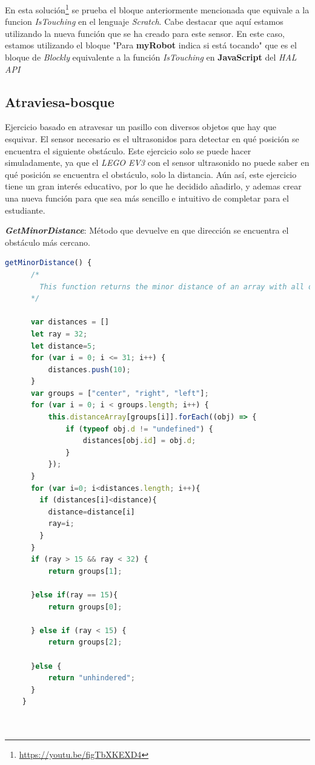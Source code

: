     En esta solución\footnote{\url{https://youtu.be/figTbXKEXD4}} se prueba el bloque anteriormente mencionada que equivale a la funcion \textit{IsTouching} en el lenguaje \textit{Scratch}. Cabe destacar que aquí estamos  utilizando la nueva función que se ha creado para este sensor. En este caso, estamos utilizando el bloque "Para \textbf{myRobot} indica si está tocando" que es el bloque de \textit{Blockly} equivalente a la función \textit{IsTouching} en \textbf{JavaScript} del \textit{HAL API}
    
\subsection{Atraviesa-bosque}
\label{subsec:atraviesabosque}
Ejercicio basado en atravesar un pasillo con diversos objetos que hay que esquivar. El sensor necesario es el ultrasonidos para detectar en qué posición se encuentra el siguiente obstáculo. Este ejercicio solo se puede hacer simuladamente, ya que el \textit{LEGO EV3} con el sensor ultrasonido no puede saber en qué posición se encuentra el obstáculo, solo la distancia. Aún así, este ejercicio tiene un gran interés educativo, por lo que he decidido añadirlo, y ademas crear una nueva función para que sea más sencillo e intuitivo de completar para el estudiante.

\textit{\textbf{GetMinorDistance}}: Método que devuelve en que dirección se encuentra el obstáculo más cercano. 

 \begin{lstlisting}[language=javascript]
 getMinorDistance() {
      /*
        This function returns the minor distance of an array with all distances
      */

      var distances = []
      let ray = 32;
      let distance=5;
      for (var i = 0; i <= 31; i++) {
          distances.push(10);
      }
      var groups = ["center", "right", "left"];
      for (var i = 0; i < groups.length; i++) {
          this.distanceArray[groups[i]].forEach((obj) => {
              if (typeof obj.d != "undefined") {
                  distances[obj.id] = obj.d;
              }
          });
      }
      for (var i=0; i<distances.length; i++){
        if (distances[i]<distance){
          distance=distance[i]
          ray=i;
        }
      }
      if (ray > 15 && ray < 32) {
          return groups[1];

      }else if(ray == 15){
          return groups[0];

      } else if (ray < 15) {
          return groups[2];

      }else {
          return "unhindered";
      }
    }
 
 
 \end{lstlisting}

